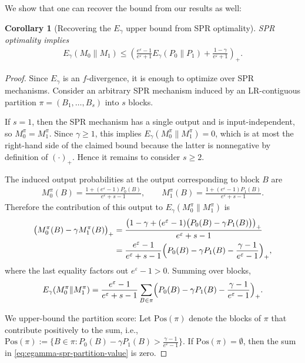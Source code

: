 \documentclass{article}
\theoremstyle{plain}
\newtheorem{corollary}[theorem]{Corollary}
\theoremstyle{definition}
\theoremstyle{plain}
\newcommand{\eps}{\varepsilon}
\begin{document}
We show that one can recover the bound from our results as well:

\begin{corollary}[Recovering the $E_\gamma$ upper bound from SPR optimality]
SPR optimality implies
\begin{align*}
    E_\gamma(M_0 \| M_1)
    \le
    \left(
        \frac{e^\eps - 1}{e^\eps + 1} E_\gamma(P_0 \| P_1)
        + \frac{1 - \gamma}{e^\eps + 1}
    \right)_+ .
\end{align*}
\end{corollary}

\begin{proof}
Since $E_\gamma$ is an $f$-divergence, it is enough to optimize over SPR mechanisms. Consider an arbitrary SPR mechanism induced by an LR-contiguous partition $\pi=(B_1,\dots,B_s)$ into $s$ blocks.

If $s=1$, then the SPR mechanism has a single output and is input-independent, so $M_0^\pi=M_1^\pi$. Since $\gamma\ge 1$, this implies $E_\gamma(M_0^\pi\|M_1^\pi)=0$, which is at most the right-hand side of the claimed bound because the latter is nonnegative by definition of $(\cdot)_+$. Hence it remains to consider $s\ge 2$.

The induced output probabilities at the output corresponding to block $B$ are
\begin{align*}
    M_0^\pi(B)
    =
    \frac{1+(e^\eps-1)P_0(B)}{e^\eps+s-1},
    \qquad
    M_1^\pi(B)
    =
    \frac{1+(e^\eps-1)P_1(B)}{e^\eps+s-1}.
\end{align*}
Therefore the contribution of this output to $E_\gamma(M_0^\pi\|M_1^\pi)$ is
\begin{align*}
    \bigl(M_0^\pi(B)-\gamma M_1^\pi(B)\bigr)_+
    &=
    \frac{\bigl(1-\gamma+(e^\eps-1)\bigl(P_0(B)-\gamma P_1(B)\bigr)\bigr)_+}{e^\eps+s-1} \\
    &=
    \frac{e^\eps-1}{e^\eps+s-1}\Bigl(P_0(B)-\gamma P_1(B)-\dfrac{\gamma-1}{e^\eps-1}\Bigr)_+,
\end{align*}
where the last equality factors out $e^\eps-1>0$. Summing over blocks,
\begin{align}
    \label{eq:egamma-spr-partition-value}
    E_\gamma(M_0^\pi\|M_1^\pi)
    =
    \frac{e^\eps-1}{e^\eps+s-1}
    \sum_{B\in\pi} \Bigl(P_0(B)-\gamma P_1(B)-\dfrac{\gamma-1}{e^\eps-1}\Bigr)_+.
\end{align}

We upper-bound the partition score: Let $\mathrm{Pos}(\pi)$ denote the blocks of $\pi$ that contribute positively to the sum, i.e., $\mathrm{Pos}(\pi):=\{B\in\pi:P_0(B)-\gamma P_1(B)>\frac{\gamma-1}{e^\eps-1}\}$.
If $\mathrm{Pos}(\pi)=\emptyset$, then the sum in \eqref{eq:egamma-spr-partition-value} is zero.


\end{proof}
\end{document}
